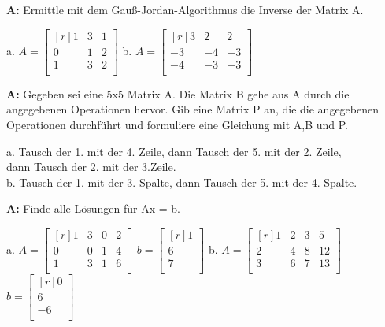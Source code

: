\documentclass[landscape,twocolumn,a4paper]{article}
\begin{document}
\bigskip {}

\textbf{A:}   
Ermittle mit dem Gauß-Jordan-Algorithmus die Inverse der Matrix  A.

a.  $A =\begin{bmatrix*}[r] 1 & 3 & 1\\  0 & 1 & 2\\ 1 & 3 & 2\\ \end{bmatrix*}$  \quad 
b.  $A =\begin{bmatrix*}[r] 3 & 2 & 2\\  -3 & -4 & -3\\ -4 & -3 & -3\\ \end{bmatrix*}$  \quad \\
\bigskip {}

\textbf{A:}   
Gegeben sei eine 5x5  Matrix A. Die Matrix B gehe aus A durch die angegebenen Operationen hervor. 
Gib eine Matrix P an, die die angegebenen Operationen durchführt und formuliere eine Gleichung mit A,B und P.


a. Tausch der 1. mit der 4. Zeile, dann Tausch der 5. mit der 2. Zeile, \\
dann Tausch der 2. mit der 3.Zeile. \\
b. Tausch der 1. mit der 3. Spalte, dann Tausch der 5. mit der 4. Spalte.

\bigskip {}

\textbf{A:}   
Finde alle Lösungen für Ax = b.

a.   $A =\begin{bmatrix*}[r] 1 & 3 & 0 & 2\\  0 & 0 & 1 & 4\\ 1 & 3 & 1 & 6\\ \end{bmatrix*}$  \quad 
      $b =\begin{bmatrix*}[r] 1 \\  6\\ 7\\ \end{bmatrix*}$  \quad 
b.   $A =\begin{bmatrix*}[r] 1 & 2 & 3 & 5\\  2 & 4 & 8 & 12\\ 3 & 6 & 7 & 13\\ \end{bmatrix*}$  \quad 
      $b =\begin{bmatrix*}[r] 0 \\  6\\ -6\\ \end{bmatrix*}$  \quad 
\bigskip {}
\end{document}
